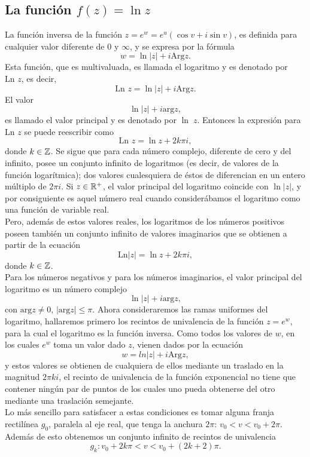 \subsection{La función $f(z)=\ln z$}
La función inversa de la función $z=e^w=e^{u}(\cos v +i\sin v)$,
es definida para cualquier valor diferente de $0$ y $\infty$, y se expresa por la fórmula 
$$w=\ln|z|+i\mbox{Arg}z.$$
Esta función, que es multivaluada, es llamada el logaritmo y es denotado por $\mbox{Ln }z$, es decir, 
$$\mbox{Ln }z=\ln|z|+i\mbox{Arg}z.$$
El valor $$\ln|z|+i\mbox{arg}z,$$ es llamado el valor principal y es denotado por $\ln\;z$. Entonces la expresión para $\mbox{Ln }z$ se puede reescribir como
$$\mbox{Ln }z=\ln z+2k\pi i,$$
donde $k\in\mathbb{Z}$. Se sigue que para cada número complejo, diferente de cero y del infinito, posee un conjunto infinito de logaritmos (es decir, de valores de la función logarítmica); dos valores cualesquiera de éstos de diferencian en un entero múltiplo de $2\pi i$. Si $z\in \mathbb{R}^{+}$, el valor principal del logaritmo coincide con $\ln|z|$, y por consiguiente es aquel número real cuando considerábamos el logaritmo como una función de variable real.\\
Pero, además de estos valores reales, los logaritmos de los números positivos poseen también un conjunto infinito de valores imaginarios que se obtienen a partir de la ecuación 
$$\mbox{Ln} |z|=\ln z+2k\pi i,$$
donde $k\in \mathbb{Z}$.\\
Para los números negativos y para los números imaginarios, el valor principal del logaritmo es un número complejo
$$\ln |z|+i\mbox{arg}z,$$ 
con $\mbox{arg}z\neq 0$, $|\mbox{arg}z|\leq \pi.$
Ahora consideraremos las ramas uniformes del logaritmo, hallaremos primero los recintos de univalencia de la función $z=e^w$, para la cual el logaritmo es la función inversa. Como todos los valores de $w$, en los cuales $e^{w}$ toma un valor dado $z$, vienen dados por la ecuación $$w=ln |z|+i\mbox{Arg}z,$$ y estos valores se obtienen de cualquiera de ellos mediante un traslado en la magnitud $2\pi k i$, el recinto de univalencia de la función exponencial no tiene que contener ningún par de puntos de los cuales uno pueda obtenerse del otro mediante una traslación semejante. \\
Lo más sencillo para satisfacer a estas condiciones es tomar alguna franja rectilínea $g_0$, paralela al eje real, que tenga la anchura $2\pi$: $v_0<v<v_0+2\pi$. Además de esto obtenemos un conjunto infinito de recintos de univalencia $$g_k:v_0+2k\pi<v<v_0+(2k+2)\pi.$$
